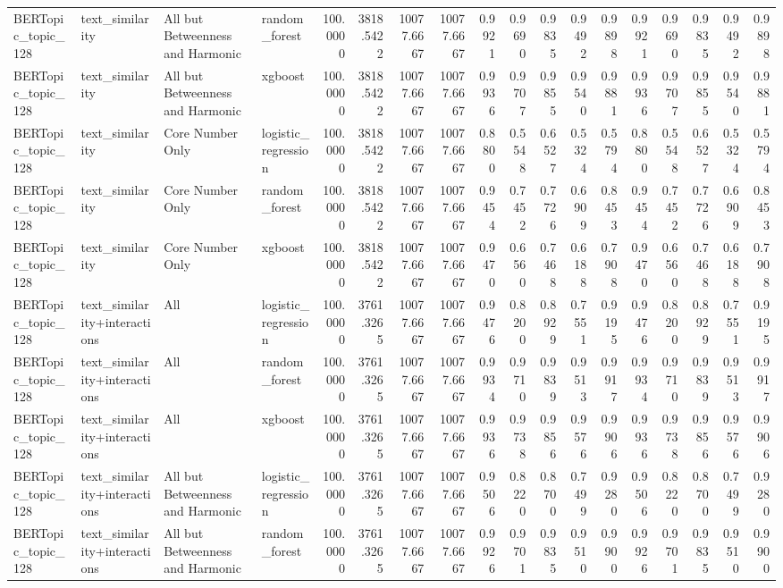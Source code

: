 \begin{tabular}{llllrrrrrrrrrrrrrr}
BERTopic_topic_128 & text_similarity & All but Betweenness and Harmonic & random_forest & 100.0000 & 3818.5422 & 10077.6667 & 10077.6667 & 0.9921 & 0.9690 & 0.9835 & 0.9492 & 0.9898 & 0.9921 & 0.9690 & 0.9835 & 0.9492 & 0.9898 \\
BERTopic_topic_128 & text_similarity & All but Betweenness and Harmonic & xgboost & 100.0000 & 3818.5422 & 10077.6667 & 10077.6667 & 0.9936 & 0.9707 & 0.9855 & 0.9540 & 0.9881 & 0.9936 & 0.9707 & 0.9855 & 0.9540 & 0.9881 \\
BERTopic_topic_128 & text_similarity & Core Number Only & logistic_regression & 100.0000 & 3818.5422 & 10077.6667 & 10077.6667 & 0.8800 & 0.5548 & 0.6527 & 0.5324 & 0.5794 & 0.8800 & 0.5548 & 0.6527 & 0.5324 & 0.5794 \\
BERTopic_topic_128 & text_similarity & Core Number Only & random_forest & 100.0000 & 3818.5422 & 10077.6667 & 10077.6667 & 0.9454 & 0.7452 & 0.7726 & 0.6909 & 0.8453 & 0.9454 & 0.7452 & 0.7726 & 0.6909 & 0.8453 \\
BERTopic_topic_128 & text_similarity & Core Number Only & xgboost & 100.0000 & 3818.5422 & 10077.6667 & 10077.6667 & 0.9470 & 0.6560 & 0.7468 & 0.6188 & 0.7908 & 0.9470 & 0.6560 & 0.7468 & 0.6188 & 0.7908 \\
BERTopic_topic_128 & text_similarity+interactions & All & logistic_regression & 100.0000 & 3761.3265 & 10077.6667 & 10077.6667 & 0.9476 & 0.8200 & 0.8929 & 0.7551 & 0.9195 & 0.9476 & 0.8200 & 0.8929 & 0.7551 & 0.9195 \\
BERTopic_topic_128 & text_similarity+interactions & All & random_forest & 100.0000 & 3761.3265 & 10077.6667 & 10077.6667 & 0.9934 & 0.9710 & 0.9839 & 0.9513 & 0.9917 & 0.9934 & 0.9710 & 0.9839 & 0.9513 & 0.9917 \\
BERTopic_topic_128 & text_similarity+interactions & All & xgboost & 100.0000 & 3761.3265 & 10077.6667 & 10077.6667 & 0.9936 & 0.9738 & 0.9856 & 0.9576 & 0.9906 & 0.9936 & 0.9738 & 0.9856 & 0.9576 & 0.9906 \\
BERTopic_topic_128 & text_similarity+interactions & All but Betweenness and Harmonic & logistic_regression & 100.0000 & 3761.3265 & 10077.6667 & 10077.6667 & 0.9506 & 0.8220 & 0.8700 & 0.7499 & 0.9280 & 0.9506 & 0.8220 & 0.8700 & 0.7499 & 0.9280 \\
BERTopic_topic_128 & text_similarity+interactions & All but Betweenness and Harmonic & random_forest & 100.0000 & 3761.3265 & 10077.6667 & 10077.6667 & 0.9926 & 0.9701 & 0.9835 & 0.9510 & 0.9900 & 0.9926 & 0.9701 & 0.9835 & 0.9510 & 0.9900 \\

\end{tabular}
